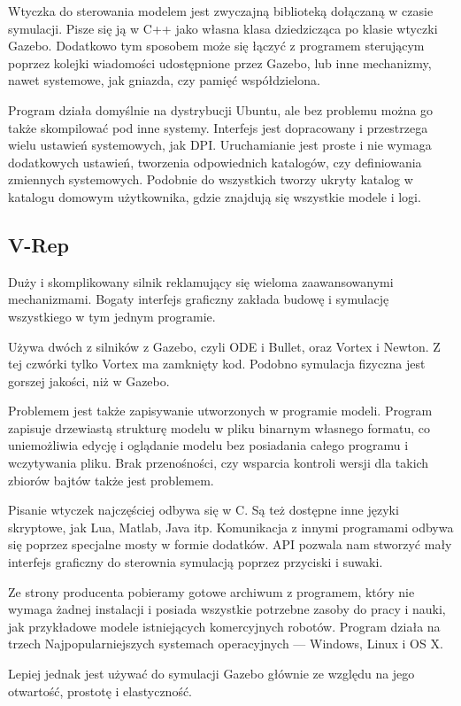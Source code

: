 Wtyczka do sterowania modelem jest zwyczajną biblioteką dołączaną w czasie symulacji. 
Pisze się ją w C++ jako własna klasa dziedzicząca po klasie wtyczki Gazebo.
Dodatkowo tym sposobem może się łączyć z programem sterującym poprzez kolejki wiadomości udostępnione przez Gazebo, lub inne mechanizmy, nawet systemowe, jak gniazda, czy pamięć współdzielona.

Program działa domyślnie na dystrybucji Ubuntu, ale bez problemu można go także skompilować pod inne systemy.
Interfejs jest dopracowany i przestrzega wielu ustawień systemowych, jak DPI.
Uruchamianie jest proste i nie wymaga dodatkowych ustawień, tworzenia odpowiednich katalogów, czy definiowania zmiennych systemowych.
Podobnie do wszystkich tworzy ukryty katalog w katalogu domowym użytkownika, gdzie znajdują się wszystkie modele i logi.

\subsection{V-Rep}
Duży i skomplikowany silnik reklamujący się wieloma zaawansowanymi mechanizmami.
Bogaty interfejs graficzny zakłada budowę i symulację wszystkiego w tym jednym programie.

Używa dwóch z silników z Gazebo, czyli ODE i Bullet, oraz Vortex i Newton. Z tej czwórki tylko Vortex ma zamknięty kod.
Podobno symulacja fizyczna jest gorszej jakości, niż w Gazebo.

Problemem jest także zapisywanie utworzonych w programie modeli.
Program zapisuje drzewiastą strukturę modelu w pliku binarnym własnego formatu, co uniemożliwia edycję i oglądanie modelu bez posiadania całego programu i wczytywania pliku.
Brak przenośności, czy wsparcia kontroli wersji dla takich zbiorów bajtów także jest problemem.

Pisanie wtyczek najczęściej odbywa się w C. Są też dostępne inne języki skryptowe, jak Lua, Matlab, Java itp.
Komunikacja z innymi programami odbywa się poprzez specjalne mosty w formie dodatków.
API pozwala nam stworzyć mały interfejs graficzny do sterownia symulacją poprzez przyciski i suwaki.

Ze strony producenta pobieramy gotowe archiwum z programem, który nie wymaga żadnej instalacji i posiada wszystkie potrzebne zasoby do pracy i nauki, jak przykładowe modele istniejących komercyjnych robotów.
Program działa na trzech Najpopularniejszych systemach operacyjnych --- Windows, Linux i OS X.

Lepiej jednak jest używać do symulacji Gazebo głównie ze względu na jego otwartość, prostotę i elastyczność.

